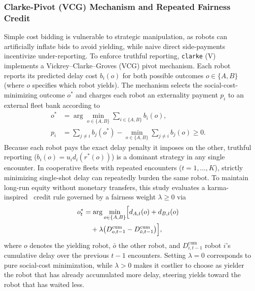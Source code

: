 \subsubsection{Clarke-Pivot (VCG) Mechanism and Repeated Fairness Credit}
Simple cost bidding is vulnerable to strategic manipulation, as robots can artificially inflate bids to avoid yielding, while naive direct side-payments incentivize under-reporting. To enforce truthful reporting, \texttt{clarke} (V)~\cite{clarke1971multipart} implements a Vickrey--Clarke--Groves (VCG) pivot mechanism. Each robot reports its predicted delay cost $b_i(o)$ for both possible outcomes $o \in \{A, B\}$ (where $o$ specifies which robot yields). The mechanism selects the social-cost-minimizing outcome $o^\ast$ and charges each robot an externality payment $p_i$ to an external fleet bank according to
\begin{equation}
\begin{aligned}
o^\ast &= \arg\min_{o\in\{A,B\}} \sum_{i\in\{A,B\}} b_i(o), \\
p_i &= \sum_{j\neq i} b_j(o^\ast) - \min_{o\in\{A,B\}} \sum_{j\neq i} b_j(o) \ge 0.
\end{aligned}
\label{eq:clarke}
\end{equation}
Because each robot pays the exact delay penalty it imposes on the other, truthful reporting ($b_i(o) = u_i d_i(r^\ast(o))$) is a dominant strategy in any single encounter.
In cooperative fleets with repeated encounters ($t = 1, \dots, K$), strictly minimizing single-shot delay can repeatedly burden the same robot. To maintain long-run equity without monetary transfers, this study evaluates a karma-inspired~\cite{censi2019karma,elokda2024karma} credit rule governed by a fairness weight $\lambda \ge 0$ via
\begin{equation}
\begin{aligned}
o_t^\ast &= \arg\min_{o\in\{A,B\}} \Bigl[d_{A,t}(o)+d_{B,t}(o) \\
&\quad + \lambda\bigl(D_{o,t-1}^{\mathrm{cum}} - D_{\bar{o},t-1}^{\mathrm{cum}}\bigr)\Bigr], 
\end{aligned}
\label{eq:karma}
\end{equation}
where $o$ denotes the yielding robot, $\bar{o}$ the other robot, and $D_{i,t-1}^{\mathrm{cum}}$ robot $i$'s cumulative delay over the previous $t-1$ encounters. Setting $\lambda = 0$ corresponds to pure social-cost minimization, while $\lambda > 0$ makes it costlier to choose as yielder the robot that has already accumulated more delay, steering yields toward the robot that has waited less.

